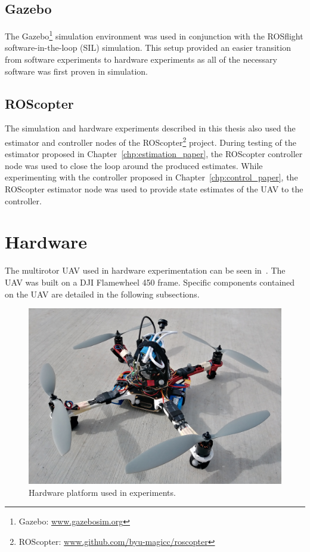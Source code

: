 \subsection {Gazebo}
The Gazebo\footnote{Gazebo:
\url{www.gazebosim.org}}
simulation environment was used
in conjunction
with the ROSflight software-in-the-loop
(SIL) simulation.
This setup provided an easier transition from software
experiments to
hardware experiments as all of the necessary software was first proven in
simulation.

\subsection {ROScopter}
The simulation and hardware experiments described in this thesis also used
the estimator and controller nodes of the ROScopter\footnote{ROScopter:
\url{www.github.com/byu-magicc/roscopter}}
project.
During testing of the estimator proposed in
Chapter~\ref{chp:estimation_paper}, the ROScopter controller node was used to
close the loop around the produced estimates.
While experimenting with the
controller proposed in Chapter~\ref{chp:control_paper}, the ROScopter estimator node
was used to provide state estimates of the UAV to the controller.

\section{Hardware}
The multirotor UAV used in hardware experimentation can be seen
in~. The UAV was built on a DJI Flamewheel 450 frame.
Specific components contained on the UAV are detailed in the following
subsections.

\begin{figure}[htbp]
  \centering
  \includegraphics[scale=0.15]{figures/hardware_platform.jpg}
  \caption[Multirotor UAV Used in Experiments]{Hardware platform used in experiments.}
  \label{f:drone_pic}
\end{figure}

